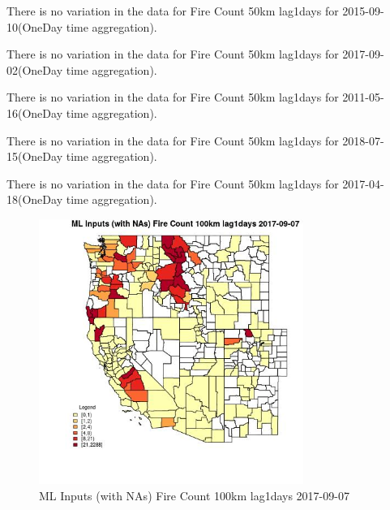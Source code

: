 There is no variation in the data for Fire Count 50km lag1days for 2015-09-10(OneDay time aggregation). 
 

There is no variation in the data for Fire Count 50km lag1days for 2017-09-02(OneDay time aggregation). 
 

There is no variation in the data for Fire Count 50km lag1days for 2011-05-16(OneDay time aggregation). 
 

There is no variation in the data for Fire Count 50km lag1days for 2018-07-15(OneDay time aggregation). 
 

There is no variation in the data for Fire Count 50km lag1days for 2017-04-18(OneDay time aggregation). 
 

\begin{figure} 
\centering  
\includegraphics[width=0.77\textwidth]{Code_Outputs/Report_ML_input_PM25_Step4_part_e_de_duplicated_aves_compiled_2019-05-21wNAs_CountyFire_Count_100km_lag1daysMean2017-09-07.jpg} 
\caption{\label{fig:Report_ML_input_PM25_Step4_part_e_de_duplicated_aves_compiled_2019-05-21wNAsCountyFire_Count_100km_lag1daysMean2017-09-07}ML Inputs (with NAs) Fire Count 100km lag1days 2017-09-07} 
\end{figure} 
 

